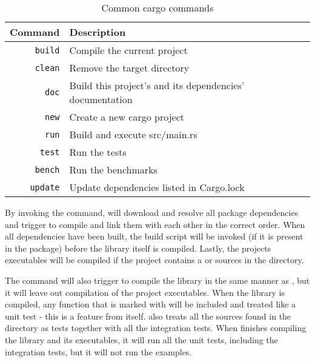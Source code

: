 \begin{table}[ht]
\begin{center}
\begin{tabular}{r|l}
\textbf{Command} & \textbf{Description}                           \\
\hline
\texttt{build}  & Compile the current project                              \\
\texttt{clean}  & Remove the target directory                              \\
\texttt{doc}    & Build this project's and its dependencies' documentation \\
\texttt{new}    & Create a new cargo project                               \\
\texttt{run}    & Build and execute src/main.rs                            \\
\texttt{test}   & Run the tests                                            \\
\texttt{bench}  & Run the benchmarks                                       \\
\texttt{update} & Update dependencies listed in Cargo.lock                 \\
\hline
\end{tabular}
\caption{Common cargo commands}
\label{tab:common_cargo_commands}
\end{center}
\end{table}

By invoking the  command, {\cargo} will download and resolve all package dependencies and trigger  to compile and link them with each other in the correct order.
When all dependencies have been built, the build script will be invoked (if it is present in the package) before the library itself is compiled.
Lastly, the projects executables will be compiled if the project contains a  or sources in the  directory.

The  command will also trigger  to compile the library in the same manner as , but it will leave out compilation of the project executables.
When the library is compiled, any function that is marked with \attrib{\#[test]} will be included and treated like a unit test - this is a feature from {\rust} itself.
{\cargo} also treats all the sources found in the  directory as tests together with all the integration tests.
When {\cargo} finishes compiling the library and its executables, it will run all the unit tests, including the integration tests, but it will not run the examples.

